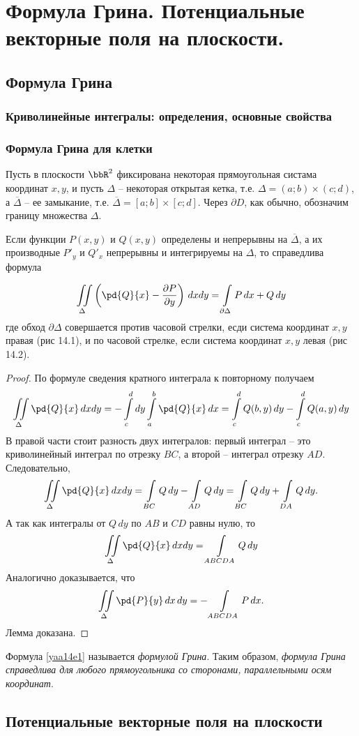 \chapter{Формула Грина. Потенциальные векторные поля на плоскости.}
\section{Формула Грина} 

\subsection{Криволинейные интегралы: определения, основные свойства}

\subsection{Формула Грина для клетки}

Пусть в плоскости $\bbR^2$ фиксирована некоторая прямоугольная систама координат $x,y$, и пусть $\Delta$ -- некоторая открытая кетка, т.е. $\Delta = (a;b)\times(c;d)$, а $\overline{\Delta}$ -- ее замыкание, т.е. $\overline{\Delta}=[a;b]\times[c;d]$. Через $\partial D$, как обычно, обозначим границу множества $\Delta$.


\begin{lemm}
Если функции $P(x,y)$ и $Q(x,y)$ определены и непрерывны на $\overline{\Delta}$, а их производные $P'_y$ и $Q'_x$ непрерывны и интегрируемы на $\Delta$, то справедлива формула

\begin{equation} \label{yaa14e1}
\iint\limits_{\Delta} \left( \pd{Q}{x}-\frac{\partial P}{\partial y} \right)\,dxdy = \int\limits_{\partial \Delta} P\,dx + Q\,dy
\end{equation}
где обход $\partial\Delta$ совершается против часовой стрелки, есди система координат $x,y$ правая (рис 14.1), и по часовой стрелке, если система координат $x,y$ левая (рис 14.2).
\end{lemm}

\begin{proof}
По формуле сведения кратного интеграла к повторному получаем
$$
\iint\limits_{\Delta} \pd{Q}{x} \,dxdy = -\int_{c}^{d}\limits dy \int_a^b\limits \pd{Q}{x}\,dx = \int_c^d\limits Q(b,y)\,dy - \int_c^d\limits Q(a,y)\,dy
$$
В правой части стоит разность двух интегралов: первый интеграл -- это криволинейный интеграл по отрезку $BC$, а второй -- интеграл отрезку $AD$. Следовательно,
$$
\iint\limits_\Delta\pd{Q}{x}\,dxdy = \int_{BC}\limits Q\,dy - \int_{AD}\limits Q\,dy = \int_{BC}\limits Q\,dy + \int_{DA}\limits Q\,dy.
$$
А так как интегралы от $Q\,dy$ по $AB$ и $CD$ равны нулю, то
$$
\iint\limits_\Delta\pd{Q}{x}\,dxdy = \int\limits_{ABCDA} Q\,dy
$$
Аналогично доказывается, что
$$
\iint\limits_\Delta\pd{P}{y}\,dx\,dy = -\int\limits_{ABCDA} P\,dx.  
$$ 
\noindent
Лемма доказана.
\end{proof}
Формула \eqref{yaa14e1} называется \textit{формулой Грина}. Таким образом, \textit{формула Грина справедлива для любого прямоугольника со сторонами, параллельными осям координат}.


\section{Потенциальные векторные поля на плоскости}